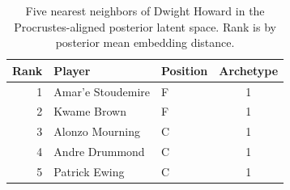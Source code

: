 \begin{table}[htbp]
  \centering\small
  \begin{tabular}{rllc}
    \toprule
    Rank & Player & Position & Archetype \\
    \midrule
    1 & Amar'e Stoudemire & F & 1 \\
    2 & Kwame Brown & F & 1 \\
    3 & Alonzo Mourning & C & 1 \\
    4 & Andre Drummond & C & 1 \\
    5 & Patrick Ewing & C & 1 \\
    \bottomrule
  \end{tabular}
  \caption{Five nearest neighbors of Dwight Howard in the Procrustes-aligned posterior latent space. Rank is by posterior mean embedding distance.}
  \label{tab:Dwight_Howard_neighbors}
\end{table}

